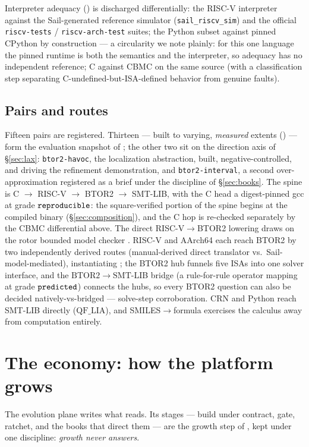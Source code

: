 Interpreter adequacy () is discharged differentially:
the RISC-V interpreter against the Sail-generated reference simulator
(\texttt{sail\_riscv\_sim}) and the official \texttt{riscv-tests} /
\texttt{riscv-arch-test} suites; the Python subset against pinned
CPython by construction --- a circularity we note plainly: for this one
language the pinned runtime is both the semantics and the interpreter,
so adequacy has no independent reference; C against CBMC on the same
source (with a
classification step separating C-undefined-but-ISA-defined behavior from
genuine faults).

\subsection{Pairs and routes}
Fifteen pairs are registered. Thirteen --- built to varying,
\emph{measured} extents () --- form the evaluation
snapshot of ; the other two sit on the direction
axis of \S\ref{sec:lax}: \texttt{btor2-havoc}, the localization
abstraction, built, negative-controlled, and driving the refinement
demonstration, and \texttt{btor2-interval}, a second over-approximation
registered as a brief under the discipline of \S\ref{sec:books}. The
spine is
C $\to$ RISC-V $\to$ BTOR2 $\to$ SMT-LIB, with the C head a digest-pinned
gcc at grade $\mathtt{reproducible}$: the square-verified portion of the spine begins
at the compiled binary (\S\ref{sec:composition}), and the C hop is
re-checked separately by the CBMC differential above. The direct
RISC-V$\to$BTOR2 lowering draws on the rotor bounded model checker
\citep{rotor2017basics}. RISC-V and AArch64 each reach BTOR2 by two
independently derived routes (manual-derived direct translator vs.\
Sail-model-mediated), instantiating ; the BTOR2 hub
funnels five ISAs into one solver interface, and the
$\mathrm{BTOR2}\to\mathrm{SMT}$-LIB bridge (a rule-for-rule operator
mapping at grade $\mathtt{predicted}$) connects the hubs, so every BTOR2 question can
also be decided natively-vs-bridged --- solve-step corroboration. CRN and
Python reach SMT-LIB directly ($\mathrm{QF\_LIA}$), and
SMILES$\to$formula exercises the calculus away from computation entirely.

\section{The economy: how the platform grows}
\label{sec:economy}

The evolution plane writes what  reads. Its
stages — build under contract, gate, ratchet, and the books that
direct them — are the growth step of \Cref{sec:overview}, kept under
one discipline: \emph{growth never answers}.

